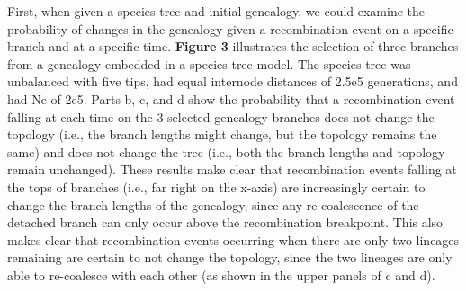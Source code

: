 \documentclass[11pt]{article}
\begin{document}

First, when given a species tree and initial genealogy, we could examine the probability of changes in the genealogy given a recombination event on a specific branch and at a specific time. \textbf{Figure 3} illustrates the selection of three branches from a genealogy embedded in a species tree model. The species tree was unbalanced with five tips, had equal internode distances of 2.5e5 generations, and had Ne of 2e5. Parts b, c, and d show the probability that a recombination event falling at each time on the 3 selected genealogy branches does not change the topology (i.e., the branch lengths might change, but the topology remains the same) and does not change the tree (i.e., both the branch lengths and topology remain unchanged). These results make clear that recombination events falling at the tops of branches (i.e., far right on the x-axis) are increasingly certain to change the branch lengths of the genealogy, since any re-coalescence of the detached branch can only occur above the recombination breakpoint. This also makes clear that recombination events occurring when there are only two lineages remaining are certain to not change the topology, since the two lineages are only able to re-coalesce with each other (as shown in the upper panels of c and d). 
\end{document}
